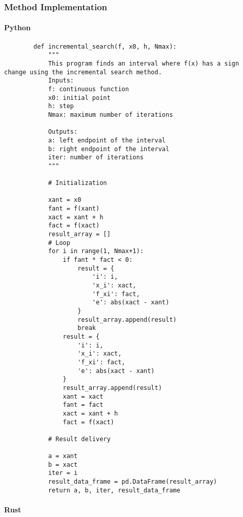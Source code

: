 \documentclass{article}
\begin{document}
            \subsubsection{Method Implementation}

                \paragraph{Python}

    \begin{verbatim}
        def incremental_search(f, x0, h, Nmax):
            """
            This program finds an interval where f(x) has a sign change using the incremental search method.
            Inputs:
            f: continuous function
            x0: initial point
            h: step
            Nmax: maximum number of iterations

            Outputs:
            a: left endpoint of the interval
            b: right endpoint of the interval
            iter: number of iterations
            """

            # Initialization

            xant = x0
            fant = f(xant)
            xact = xant + h
            fact = f(xact)
            result_array = []
            # Loop
            for i in range(1, Nmax+1):
                if fant * fact < 0:
                    result = {
                        'i': i,
                        'x_i': xact,
                        'f_xi': fact,
                        'e': abs(xact - xant)
                    }
                    result_array.append(result)
                    break
                result = {
                    'i': i,
                    'x_i': xact,
                    'f_xi': fact,
                    'e': abs(xact - xant)
                }
                result_array.append(result)
                xant = xact
                fant = fact
                xact = xant + h
                fact = f(xact)

            # Result delivery

            a = xant
            b = xact
            iter = i
            result_data_frame = pd.DataFrame(result_array)
            return a, b, iter, result_data_frame
        \end{verbatim}

    \paragraph{Rust}\label{paragraph:rust}
\end{document}
